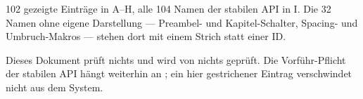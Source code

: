 \begin{defbox}[Vollständigkeit][tone=neutral, weight=quiet]
  102 gezeigte Einträge in A--H, alle 104 Namen der stabilen API in I.
  Die 32 Namen ohne eigene Darstellung — Preambel- und Kapitel-Schalter,
  Spacing- und Umbruch-Makros — stehen dort mit einem Strich statt einer ID.
\end{defbox}

\begin{warnbox}
  Dieses Dokument prüft nichts und wird von nichts geprüft. Die
  Vorführ-Pflicht der stabilen API hängt weiterhin an ;
  ein hier gestrichener Eintrag verschwindet nicht aus dem System.
\end{warnbox}
